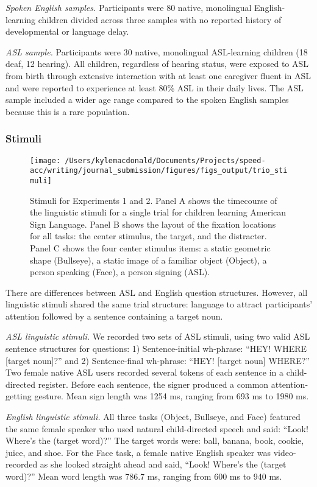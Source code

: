 \documentclass[oneside]{report}
\begin{document}
\emph{Spoken English samples.} Participants were 80 native, monolingual
English-learning children divided across three samples with no reported
history of developmental or language delay.

\emph{ASL sample.} Participants were 30 native, monolingual ASL-learning
children (18 deaf, 12 hearing). All children, regardless of hearing
status, were exposed to ASL from birth through extensive interaction
with at least one caregiver fluent in ASL and were reported to
experience at least 80\% ASL in their daily lives. The ASL sample
included a wider age range compared to the spoken English samples
because this is a rare population.

\subsubsection{Stimuli}\label{stimuli-1}
\begin{figure}[!t]

{\centering \texttt{[image: /Users/kylemacdonald/Documents/Projects/speed-acc/writing/journal\_submission/figures/figs\_output/trio\_stimuli]} 

}

\caption{Stimuli for Experiments 1 and 2. Panel A shows the timecourse of the linguistic stimuli for a single trial for children learning American Sign Language. Panel B shows the layout of the fixation locations for all tasks: the center stimulus, the target, and the distracter. Panel C shows the four center stimulus items: a static geometric shape (Bullseye), a static image of a familiar object (Object), a person speaking (Face), a person signing (ASL).}\label{fig:trio-stim}
\end{figure}
There are differences between ASL and English question structures.
However, all linguistic stimuli shared the same trial structure:
language to attract participants' attention followed by a sentence
containing a target noun.

\emph{ASL linguistic stimuli.} We recorded two sets of ASL stimuli,
using two valid ASL sentence structures for questions: 1)
Sentence-initial wh-phrase: ``HEY! WHERE {[}target noun{]}?'' and 2)
Sentence-final wh-phrase: ``HEY! {[}target noun{]} WHERE?'' Two female
native ASL users recorded several tokens of each sentence in a
child-directed register. Before each sentence, the signer produced a
common attention-getting gesture. Mean sign length was 1254 ms, ranging
from 693 ms to 1980 ms.

\emph{English linguistic stimuli.} All three tasks (Object, Bullseye,
and Face) featured the same female speaker who used natural
child-directed speech and said: ``Look! Where's the (target word)?'' The
target words were: ball, banana, book, cookie, juice, and shoe. For the
Face task, a female native English speaker was video-recorded as she
looked straight ahead and said, ``Look! Where's the (target word)?''
Mean word length was 786.7 ms, ranging from 600 ms to 940 ms.
\end{document}
